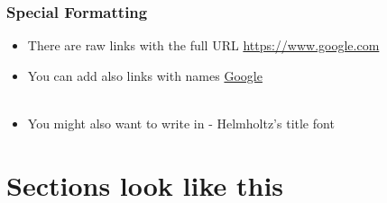 \documentclass[aspectratio=1610]{beamer}
\begin{document}
\begin{frame}
    \frametitle{Special Formatting}
    
    \begin{itemize}
        \item There are raw links with the full URL \url{https://www.google.com}
        \item You can add also links with names \href{https://www.google.com}{Google}\\~
        \item You might also want to write in  - Helmholtz's title font
    \end{itemize}
\end{frame}

\section{Sections look like this}
\end{document}
